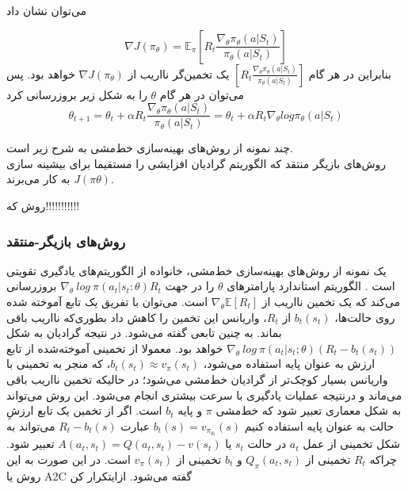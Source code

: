 می‌توان نشان داد 


$$\nabla J(\pi_\theta) = \mathbb{E}_\pi \left[ R_t \frac{\nabla_\theta \pi_\theta (a|S_t)}{\pi_\theta (a|S_t)} \right]$$
بنابراین در هر گام
$\left[ R_t \frac{\nabla_\theta \pi_\theta (a|S_t)}{\pi_\theta (a|S_t)} \right]$
یک تخمین‌گر نااریب از $\nabla J(\pi_\theta)$ خواهد بود\cite{suttonbook}. پس می‌توان در هر گام $\theta$ را به شکل زیر بروزرسانی کرد
$$\theta_{t+1} = \theta_t + \alpha R_t \frac{\nabla_\theta \pi_\theta (a|S_t)}{\pi_\theta (a|S_t)} = \theta_t + \alpha R_t \nabla_\theta log \pi_\theta (a|S_t)$$

چند نمونه از روش‌های بهینه‌سازی خط‌مشی به شرح زیر است. \\
روش‌های بازیگر منتقد
  که الگوریتم 
 گرادیان افزایشی
   را مستقیما برای بیشینه سازی 
$J(\pi\theta)$
به کار می‌برند.

روش  
 که!!!!!!!!!!!

\subsubsection{روش‌های بازیگر-منتقد}
یک نمونه از روش‌های بهینه‌سازی خط‌مشی، خانواده
 از الگوریتم‌های یادگیری تقویتی است
\cite{williams1992simple}.
الگوریتم استاندارد  پارامترهای $\theta$ را در جهت 
 $\nabla_\theta \  log  \ \pi (a_t|s_t:\theta)R_t$ بروزرسانی می‌کند که یک تخمین نااریب از
   $\nabla_\theta \mathbb{E}[R_t]$
است. می‌توان  با تفریق یک تابع آموخته شده روی حالت‌ها، 
$b_t(s_t)$
از 
$R_t$، واریانس این تخمین را کاهش داد بطوری‌که نااریب باقی بماند. به چنین تابعی  گفته می‌شود. در نتیجه گرادیان به شکل
$\nabla_\theta \ log \ \pi(a_t|s_t;\theta) (R_t - b_t(s_t))$
خواهد بود. معمولا از تخمینی آموخته‌شده از تابع ارزش به عنوان پایه استفاده می‌شود،
$b_t(s_t) \approx v_\pi (s_t)$،
 که منجر به تخمینی با واریانس بسیار کوچک‌تر از گرادیان خط‌مشی می‌\nf شود؛ در حالیکه تخمین نااریب باقی می‌ماند و درنتیجه عملیات یادگیری با سرعت بیشتری انجام می‌شود.
این روش می‌تواند به شکل معماری   تعبیر شود که خط‌مشی $\pi$  و پایه $b_t$  است. اگر از تخمین یک تابع ارزشِ حالت به عنوان پایه استفاده کنیم 
$b_t(s) = v_{\pi_{\theta_t}}(s)$ عبارت $R_t - b_t(s)$ می‌تواند به شکل تخمینی از   عمل $a_t$ در حالت $s_t$ یا 
$A(a_t,s_t)=Q(a_t,s_t)-v(s_t)$ تعبیر شود. چراکه $R_t$ تخمینی از  $Q_\pi (a_t, s_t)$ و $b_t$ تخمینی از  $v_\pi (s_t)$ است. در این صورت به این روش 
 یا A2C گفته می‌شود.
‌ازای{تکرار کن}

